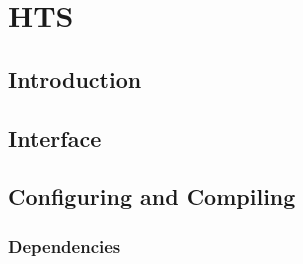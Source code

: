 
\chapter{HTS}
\label{C:HTS}


\section{Introduction}\label{S:HTS:Introduction}

\section{Interface}\label{S:HTS:Interface}

\section{Configuring and Compiling}\label{S::HTS:Config}

\subsection{Dependencies}

